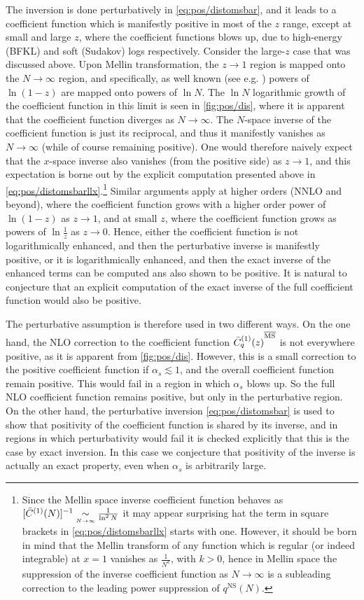 The
inversion is done perturbatively in \cref{eq:pos/distomsbar}, and it
leads to a coefficient function which is manifestly positive in most
of the $z$ range, except at small and large $z$, where the coefficient
functions blows up, due to high-energy (BFKL) and soft (Sudakov) logs
respectively. Consider the large-$z$ case that was discussed
above. Upon 
Mellin transformation, the $z\to 1$ region is mapped onto the
$N\to\infty$ region, and specifically, as well known (see
e.g. \cite{Forte:2002ni}) powers of $\ln(1-z)$ are mapped onto
powers of $\ln N$.  
The $\ln N$ logarithmic growth of the coefficient function in this limit is
seen in \cref{fig:pos/dis}, where it is apparent that the coefficient function
diverges as $N\to\infty$. The $N$-space inverse of the coefficient function is
just its reciprocal, and thus it manifestly vanishes as $N\to\infty$ (while of
course remaining positive).
One would therefore naively expect that the $x$-space inverse also vanishes
(from the positive side) as $z\to1$, and this expectation is borne out by the
explicit computation presented above in
\cref{eq:pos/distomsbarllx}.\footnote{
  Since the Mellin space inverse coefficient function behaves as $[\bar
  C^{(1)}(N)]^{-1}\mathrel{\mathop{\sim}\limits_{\scriptscriptstyle {N\rightarrow\infty }}}\frac{1}{\ln^2 N}$ it may appear surprising hat the
  term in square brackets in \cref{eq:pos/distomsbarllx} starts with one.
  However, it should be born in mind that the Mellin transform of any function
  which is regular (or indeed integrable) at $x=1$ vanishes as $\frac{1}{N^k}$,
  with $k>0$, hence in Mellin space the suppression of the inverse coefficient
  function as $N\to\infty$ is a subleading correction to the leading power
  suppression of $q^{\textrm{NS}}(N)$.
}
Similar arguments apply at higher orders (NNLO and beyond), where the
coefficient function grows with a higher order power of $\ln(1-z)$ as $z\to1$,
and at small $z$, where the coefficient function grows as powers of $\ln
\frac{1}{z}$ as $z\to0$.
Hence, either the coefficient function is not logarithmically enhanced, and
then the perturbative inverse is manifestly positive, or it is logarithmically
enhanced, and then the exact inverse of the enhanced terms can be computed ans
also shown to be positive.
It is natural to conjecture that an explicit computation of the exact inverse
of the full coefficient function would also be positive.

The perturbative  assumption is therefore used in two different
ways. On the one hand, the NLO correction to the \msbar{}  coefficient function
 ${\bar  C^{(1)}_q(z)}^{{\overline{\textrm{MS}}}}$ is not everywhere positive, as it is
apparent from \cref{fig:pos/dis}. However, this is a small correction
to the positive coefficient function if $\alpha_s\lesssim 1$, and the
overall coefficient function remain positive. This would fail in a
region in which $\alpha_s$ blows up. So the full NLO coefficient
function remains positive, but only in the perturbative region. On the other
hand, the perturbative inversion \cref{eq:pos/distomsbar} is used to
show that positivity of the coefficient function is shared by its
inverse, and in regions in which perturbativity would fail it is
checked explicitly that this is the case by exact inversion. In this
case we conjecture that positivity of the inverse is actually an exact
property, even when $\alpha_s$ is arbitrarily large.

